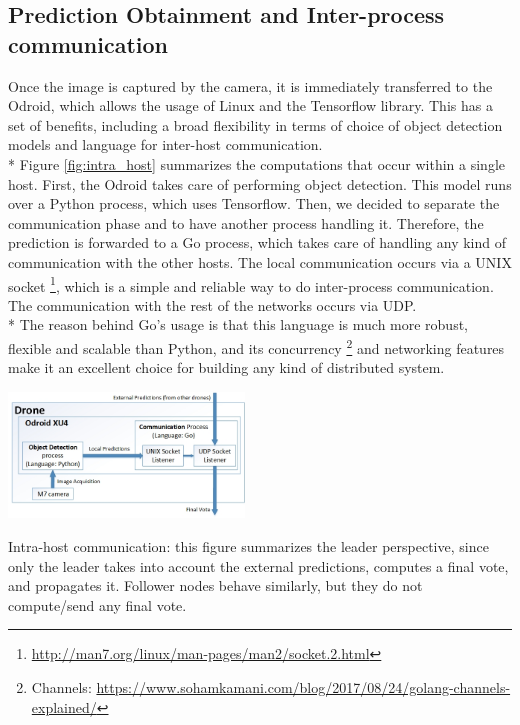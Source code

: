 \documentclass[10pt,conference,compsocconf]{IEEEtran}
\begin{document}
\subsection{Prediction Obtainment and Inter-process communication}Once the image is captured by the camera, it is immediately transferred to the Odroid, which allows the usage of Linux and the Tensorflow library. This has a set of benefits, including a broad flexibility in terms of choice of object detection models and language for inter-host communication.\\*
Figure \ref{fig:intra_host} summarizes the computations that occur within a single host.
First, the Odroid takes care of performing object detection. This model runs over a Python process, which uses Tensorflow. Then, we decided to separate the communication phase and to have another process handling it.
Therefore, the prediction is forwarded to a Go process, which takes care of handling any kind of communication with the other hosts. The local communication occurs via a UNIX socket \footnote{\url{http://man7.org/linux/man-pages/man2/socket.2.html}}, which is a simple and reliable way to do inter-process communication. The communication with the rest of the networks occurs via UDP.\\*
The reason behind Go's usage is that this language is much more robust, flexible and scalable than Python, and its concurrency \footnote{Channels: \url{https://www.sohamkamani.com/blog/2017/08/24/golang-channels-explained/}} and networking features make it an excellent choice for building any kind of distributed system.
\begin{center}
	\captionsetup{type=figure}
	\includegraphics[width=0.47\textwidth]{img/protocol_sketch_intra_host.jpg}
	\caption {Intra-host communication: this figure summarizes the leader perspective, since only the leader takes into account the external predictions, computes a final vote, and propagates it. Follower nodes behave similarly, but they do not compute/send any final vote.}
	\label{fig:intra_host}
\end{center}
\end{document}
